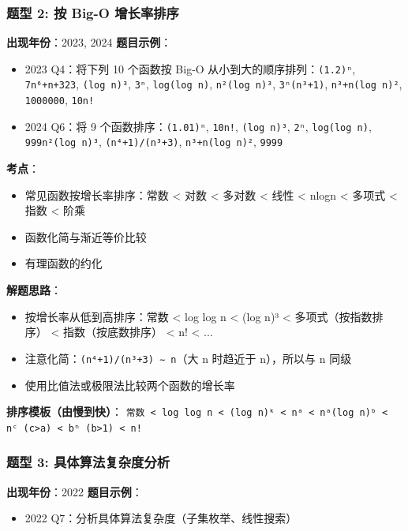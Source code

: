 \documentclass[10pt,a4paper,openany]{ctexbook}
\theoremstyle{definition}
\theoremstyle{remark}
\begin{document}
\vspace{-2pt}

\subsubsection{题型 2: 按 Big-O 增长率排序}

\textbf{出现年份}：2023, 2024
\textbf{题目示例}：
\begin{itemize}
\item 2023 Q4：将下列 10 个函数按 Big-O 从小到大的顺序排列：\texttt{(1.2)ⁿ}, \texttt{7n⁶+n+323}, \texttt{(log n)³}, \texttt{3ⁿ}, \texttt{log(log n)}, \texttt{n²(log n)³}, \texttt{3ⁿ(n³+1)}, \texttt{n³+n(log n)²}, \texttt{1000000}, \texttt{10n!}
\item 2024 Q6：将 9 个函数排序：\texttt{(1.01)ⁿ}, \texttt{10n!}, \texttt{(log n)³}, \texttt{2ⁿ}, \texttt{log(log n)}, \texttt{999n²(log n)³}, \texttt{(n⁴+1)/(n³+3)}, \texttt{n³+n(log n)²}, \texttt{9999}

\end{itemize}

\textbf{考点}：
\begin{itemize}
\item 常见函数按增长率排序：常数 < 对数 < 多对数 < 线性 < nlogn < 多项式 < 指数 < 阶乘
\item 函数化简与渐近等价比较
\item 有理函数的约化

\end{itemize}

\textbf{解题思路}：
\begin{itemize}
\item 按增长率从低到高排序：常数 < log log n < (log n)³ < 多项式（按指数排序） < 指数（按底数排序） < n! < ...
\item 注意化简：\texttt{(n⁴+1)/(n³+3) ∼ n}（大 n 时趋近于 n），所以与 n 同级
\item 使用比值法或极限法比较两个函数的增长率

\end{itemize}

\textbf{排序模板（由慢到快）}：
\texttt{常数 < log log n < (log n)ᵏ < nᵃ < nᵃ(log n)ᵇ < nᶜ (c>a) < bⁿ (b>1) < n!}
\vspace{-2pt}

\subsubsection{题型 3: 具体算法复杂度分析}

\textbf{出现年份}：2022
\textbf{题目示例}：
\begin{itemize}
\item 2022 Q7：分析具体算法复杂度（子集枚举、线性搜索）

\end{itemize}
\end{document}
